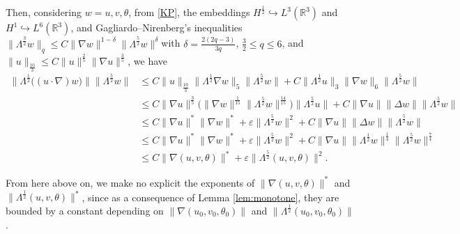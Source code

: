 \documentclass[a4paper]{article}
\newcommand{\R}{\mathbb{R}}
\begin{document}
Then, considering $w=u,v,\theta$, from \eqref{KP}, the embeddings
$H^{\frac{1}{2}}\hookrightarrow L^3(\R^3)$ and
$H^1\hookrightarrow L^6(\R^3)$, and Gagliardo--Nirenberg's inequalities
$\|\Lambda^\frac32 w\|_q \le C\|\nabla w\|^{1-\delta}
\|\Lambda^\frac52 w\|^{\delta}$with $\delta=\frac{2(2q-3)}{3q}$,
$\frac{3}{2}\leq q\leq 6$, and
$\|u\|_\frac{10}{3}\le C \|u\|^\frac{2}{5} \|\nabla u\|^\frac{3}{5}$,
we have
%
\begin{equation*}
  \begin{aligned}
    \| \Lambda^{\frac{1}{2}}\big( (u\cdot \nabla) w\big) \|
    \|\Lambda^{\frac{5}{2}}w\| &\leq
    C\|u\|_\frac{10}{3}\|\Lambda^{\frac{1}{2}}\nabla w\|_5
    \|\Lambda^{\frac{5}{2}}w\| + C\|\Lambda^{\frac{1}{2}}
    u\|_3\|\nabla w\|_6 \|\Lambda^{\frac{5}{2}}w\|
    \\
    & \leq C \|\nabla u\|^{\frac{3}{5}} \big(\|\nabla
    w\|^{\frac{1}{15}} \|\Lambda^{\frac{5}{2}} w\|^{\frac{14}{15}}
    \big) \|\Lambda^{\frac{5}{2}} u\|+ C\|\nabla u\|\|\Delta w\|
    \|\Lambda^{\frac{5}{2}}w\|
    \\
    & \leq C \|\nabla u\|^\ast\|\nabla w\|^\ast+\varepsilon
    \|\Lambda^{\frac{5}{2}}w\|^2 + C\|\nabla u\|\|\Delta w\|
    \|\Lambda^{\frac{5}{2}}w\|
    \\
    & \leq C \|\nabla u\|^\ast\|\nabla w\|^\ast+\varepsilon
    \|\Lambda^{\frac{5}{2}}w\|^2 + C\|\nabla
    u\|\|\Lambda^{\frac{1}{2}} w\|^{\frac{1}{4}}
    \|\Lambda^{\frac{5}{2}}w\|^{\frac{7}{4}}
    \\
    &\le C \|\nabla (u, v, \theta)\|^\ast + \varepsilon
    \|\Lambda^{\frac{5}{2}} (u, v, \theta)\|^2.
  \end{aligned}
\end{equation*}
  
From here above
on, we make no explicit the exponents of
$\|\nabla (u,v,\theta)\|^\ast$ and
$\|\Lambda^\frac12 (u,v,\theta)\|^\ast$, since as a consequence of
Lemma \ref{lem:monotone}, they are
bounded by a constant
depending on $\|\nabla (u_0,v_0,\theta_0)\|$ and
$\|\Lambda^\frac12 (u_0,v_0, \theta_0)\|$.
\end{document}
